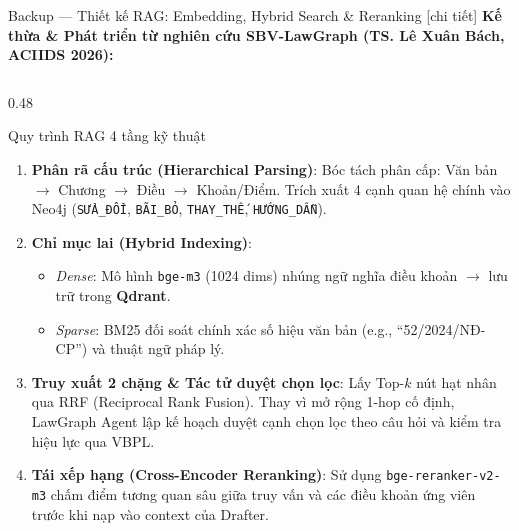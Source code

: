 \documentclass[aspectratio=169,10pt]{beamer}
\begin{document}
\begin{frame}{Backup --- Thiết kế RAG: Embedding, Hybrid Search \& Reranking [chi tiết]}
\footnotesize
\textbf{Kế thừa \& Phát triển từ nghiên cứu SBV-LawGraph (TS. Lê Xuân Bách, ACIIDS 2026):}
\vskip0.15cm
\begin{columns}[T]
\begin{column}{0.48\textwidth}
\begin{block}{\small Quy trình RAG 4 tầng kỹ thuật}
\scriptsize
\begin{enumerate}
  \item \textbf{Phân rã cấu trúc (Hierarchical Parsing)}:
    Bóc tách phân cấp: Văn bản $\rightarrow$ Chương $\rightarrow$ Điều $\rightarrow$ Khoản/Điểm. Trích xuất 4 cạnh quan hệ chính vào Neo4j (\texttt{SỬA\_ĐỔI}, \texttt{BÃI\_BỎ}, \texttt{THAY\_THẾ}, \texttt{HƯỚNG\_DẪN}).
  \item \textbf{Chỉ mục lai (Hybrid Indexing)}:
    \begin{itemize}\tiny
      \item \textit{Dense}: Mô hình \texttt{bge-m3} (1024 dims) nhúng ngữ nghĩa điều khoản $\rightarrow$ lưu trữ trong \textbf{Qdrant}.
      \item \textit{Sparse}: BM25 đối soát chính xác số hiệu văn bản (e.g., ``52/2024/NĐ-CP'') và thuật ngữ pháp lý.
    \end{itemize}
  \item \textbf{Truy xuất 2 chặng \& Tác tử duyệt chọn lọc}:
    Lấy Top-$k$ nút hạt nhân qua RRF (Reciprocal Rank Fusion). Thay vì mở rộng 1-hop cố định, LawGraph Agent lập kế hoạch duyệt cạnh chọn lọc theo câu hỏi và kiểm tra hiệu lực qua VBPL.
  \item \textbf{Tái xếp hạng (Cross-Encoder Reranking)}:
    Sử dụng \texttt{bge-reranker-v2-m3} chấm điểm tương quan sâu giữa truy vấn và các điều khoản ứng viên trước khi nạp vào context của Drafter.
\end{enumerate}
\end{block}
\end{column}


\end{columns}
\end{frame}
\end{document}
